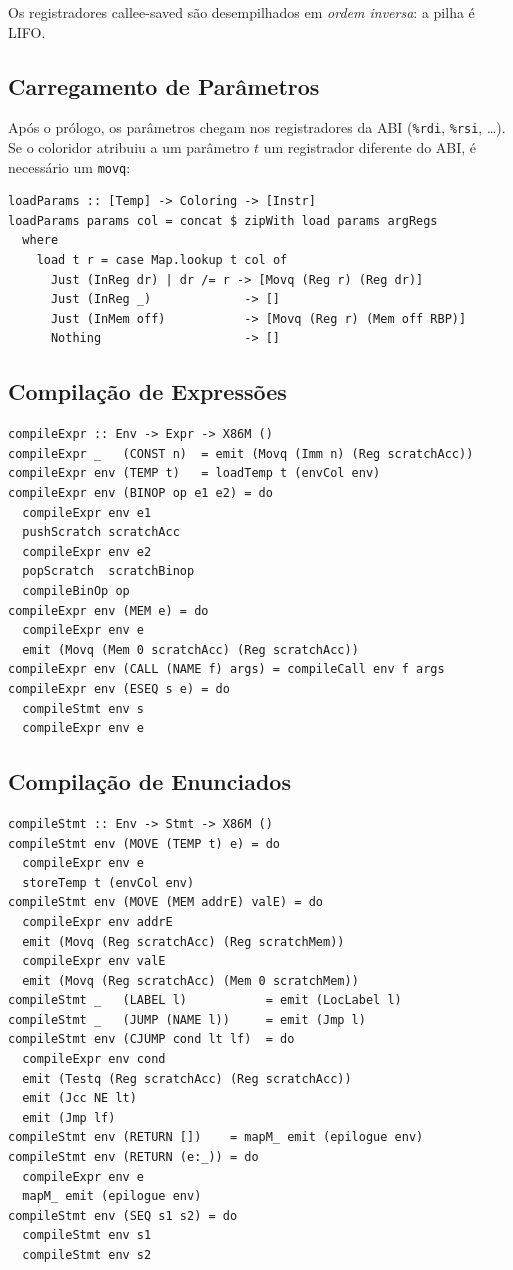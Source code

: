 Os registradores callee-saved são desempilhados em \emph{ordem inversa}:
a pilha é LIFO.

\subsection{Carregamento de Parâmetros}

Após o prólogo, os parâmetros chegam nos registradores da ABI
(\texttt{\%rdi}, \texttt{\%rsi}, \ldots). Se o coloridor atribuiu a um
parâmetro $t$ um registrador diferente do ABI, é necessário um
\texttt{movq}:

\begin{verbatim}
loadParams :: [Temp] -> Coloring -> [Instr]
loadParams params col = concat $ zipWith load params argRegs
  where
    load t r = case Map.lookup t col of
      Just (InReg dr) | dr /= r -> [Movq (Reg r) (Reg dr)]
      Just (InReg _)             -> []
      Just (InMem off)           -> [Movq (Reg r) (Mem off RBP)]
      Nothing                    -> []
\end{verbatim}

\subsection{Compilação de Expressões}

\begin{verbatim}
compileExpr :: Env -> Expr -> X86M ()
compileExpr _   (CONST n)  = emit (Movq (Imm n) (Reg scratchAcc))
compileExpr env (TEMP t)   = loadTemp t (envCol env)
compileExpr env (BINOP op e1 e2) = do
  compileExpr env e1
  pushScratch scratchAcc
  compileExpr env e2
  popScratch  scratchBinop
  compileBinOp op
compileExpr env (MEM e) = do
  compileExpr env e
  emit (Movq (Mem 0 scratchAcc) (Reg scratchAcc))
compileExpr env (CALL (NAME f) args) = compileCall env f args
compileExpr env (ESEQ s e) = do
  compileStmt env s
  compileExpr env e
\end{verbatim}

\subsection{Compilação de Enunciados}

\begin{verbatim}
compileStmt :: Env -> Stmt -> X86M ()
compileStmt env (MOVE (TEMP t) e) = do
  compileExpr env e
  storeTemp t (envCol env)
compileStmt env (MOVE (MEM addrE) valE) = do
  compileExpr env addrE
  emit (Movq (Reg scratchAcc) (Reg scratchMem))
  compileExpr env valE
  emit (Movq (Reg scratchAcc) (Mem 0 scratchMem))
compileStmt _   (LABEL l)           = emit (LocLabel l)
compileStmt _   (JUMP (NAME l))     = emit (Jmp l)
compileStmt env (CJUMP cond lt lf)  = do
  compileExpr env cond
  emit (Testq (Reg scratchAcc) (Reg scratchAcc))
  emit (Jcc NE lt)
  emit (Jmp lf)
compileStmt env (RETURN [])    = mapM_ emit (epilogue env)
compileStmt env (RETURN (e:_)) = do
  compileExpr env e
  mapM_ emit (epilogue env)
compileStmt env (SEQ s1 s2) = do
  compileStmt env s1
  compileStmt env s2
\end{verbatim}

